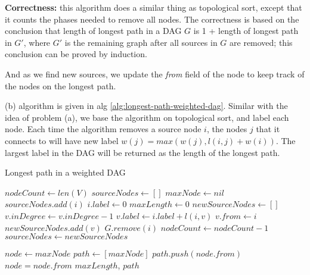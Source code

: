 \documentclass{article}
\begin{document}
\begin{description}
  \textbf{Correctness:} this algorithm does a similar thing as topological sort, except that it counts the phases needed to remove all nodes. The correctness is based on the conclusion that length of longest path in a DAG $G$ is 1 + length of longest path in $G'$, where $G'$ is the remaining graph after all sources in $G$ are removed; this conclusion can be proved by induction. 

  And as we find new sources, we update the \textit{from} field of the node to keep track of the nodes on the longest path.

  (b) algorithm is given in alg \ref{alg:longest-path-weighted-dag}. Similar with the idea of problem (a), we base the algorithm on topological sort, and label each node. Each time the algorithm removes a source node $i$, the nodes $j$ that it connects to will have new label $w(j) = max(w(j), l(i,j) + w(i))$. The largest label in the DAG will be returned as the length of the longest path. 

  \begin{algorithm}[h]
  \caption{Longest path in a weighted DAG}
  \label{alg:longest-path-weighted-dag}
    \begin{algorithmic}[1]
  
      \State $nodeCount \gets len(V)$
      \State $sourceNodes \gets []$
      \State $maxNode \gets nil$
          \State $sourceNodes.add(i)$
          \State $i.label \gets 0$
        \EndIf
      \EndFor
      \State $maxLength \gets 0$
        \State $newSourceNodes \gets []$
            \State $v.inDegree \gets v.inDegree - 1$
              \State $v.label \gets i.label + l(i,v)$
              \State $v.from \gets i$
            \EndIf
            \EndIf
              \State $newSourceNodes.add(v)$
            \EndIf
          \EndFor
          \State $G.remove(i)$
          \State $nodeCount \gets nodeCount - 1$
        \EndFor
        \State $sourceNodes \gets newSourceNodes$
      \EndWhile

      \State $node \gets maxNode$
      \State $path \gets [maxNode]$
        \State $path.push(node.from)$
        \State $node = node.from$
      \EndWhile
      \State \Return $maxLength$, $path$
    \EndFunction
    

\end{algorithmic}
\end{algorithm}
\end{description}
\end{document}
